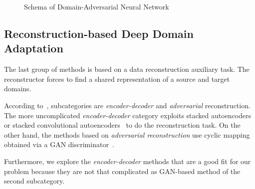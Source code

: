 \begin{figure}
\begin{center}
\end{center}
\caption{Schema of Domain-Adversarial Neural Network}
\end{figure}

\subsection{Reconstruction-based Deep Domain Adaptation}
\label{reconstruction_da}

The last group of methods is based on a data reconstruction auxiliary task.
The reconstructor forces to find a shared representation of a source and target domains.

According to~\cite{wang2018}, subcategories are \textit{encoder-decoder} and
\textit{adversarial} reconstruction.
The more uncomplicated \textit{encoder-decoder} category exploits stacked autoencoders~\cite{vincent2008} or stacked convolutional autoencoders~\cite{masci2011}
to do the reconstruction task.
On the other hand, the methods based on \textit{adversarial reconstruction} use cyclic mapping obtained via a GAN discriminator~\cite{goodfellow2014}.

Furthermore, we explore the \textit{encoder-decoder} methods that are a good fit for our problem
because they are not that complicated as GAN-based method of the second subcategory.

